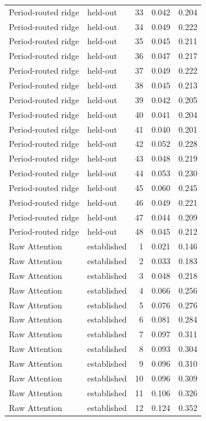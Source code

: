 \begin{tabular}{llrrr}
Period-routed ridge & held-out & 33 & 0.042 & 0.204 \\
Period-routed ridge & held-out & 34 & 0.049 & 0.222 \\
Period-routed ridge & held-out & 35 & 0.045 & 0.211 \\
Period-routed ridge & held-out & 36 & 0.047 & 0.217 \\
Period-routed ridge & held-out & 37 & 0.049 & 0.222 \\
Period-routed ridge & held-out & 38 & 0.045 & 0.213 \\
Period-routed ridge & held-out & 39 & 0.042 & 0.205 \\
Period-routed ridge & held-out & 40 & 0.041 & 0.204 \\
Period-routed ridge & held-out & 41 & 0.040 & 0.201 \\
Period-routed ridge & held-out & 42 & 0.052 & 0.228 \\
Period-routed ridge & held-out & 43 & 0.048 & 0.219 \\
Period-routed ridge & held-out & 44 & 0.053 & 0.230 \\
Period-routed ridge & held-out & 45 & 0.060 & 0.245 \\
Period-routed ridge & held-out & 46 & 0.049 & 0.221 \\
Period-routed ridge & held-out & 47 & 0.044 & 0.209 \\
Period-routed ridge & held-out & 48 & 0.045 & 0.212 \\
Raw Attention & established & 1 & 0.021 & 0.146 \\
Raw Attention & established & 2 & 0.033 & 0.183 \\
Raw Attention & established & 3 & 0.048 & 0.218 \\
Raw Attention & established & 4 & 0.066 & 0.256 \\
Raw Attention & established & 5 & 0.076 & 0.276 \\
Raw Attention & established & 6 & 0.081 & 0.284 \\
Raw Attention & established & 7 & 0.097 & 0.311 \\
Raw Attention & established & 8 & 0.093 & 0.304 \\
Raw Attention & established & 9 & 0.096 & 0.310 \\
Raw Attention & established & 10 & 0.096 & 0.309 \\
Raw Attention & established & 11 & 0.106 & 0.326 \\
Raw Attention & established & 12 & 0.124 & 0.352 \\

\end{tabular}
